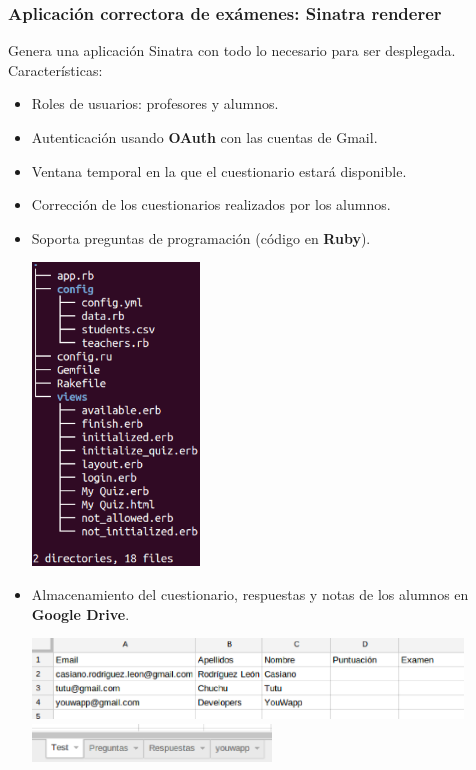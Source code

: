 \documentclass{beamer}
\begin{document}
\begin{frame}[allowframebreaks]
\frametitle{Aplicación correctora de exámenes: Sinatra renderer}
  Genera una aplicación Sinatra con todo lo necesario para ser desplegada.
  Características:
  \begin{itemize}
    \item Roles de usuarios: profesores y alumnos.
    \item Autenticación usando {\bfseries OAuth} con las cuentas de Gmail.
    \item Ventana temporal en la que el cuestionario estará disponible.
    \item Corrección de los cuestionarios realizados por los alumnos.
    \item Soporta preguntas de programación (código en {\bfseries Ruby}).
    \framebreak
    
    \begin{center}
      \includegraphics[width=0.35\textwidth]{img/tree.eps}
    \end{center}
    \framebreak
    
    \item Almacenamiento del cuestionario, respuestas y notas de los alumnos en {\bfseries Google Drive}.
    \bigskip
    \begin{center}
      \includegraphics[width=0.9\textwidth]{img/app0.eps}
      \newline
      \newline
      \includegraphics[width=0.5\textwidth]{img/app2.eps}
    \end{center}
    

\end{itemize}
\end{frame}
\end{document}
